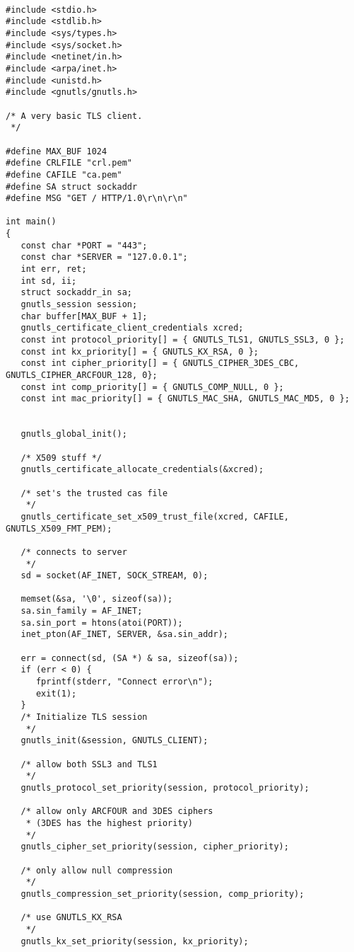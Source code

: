 \begin{verbatim}

#include <stdio.h>
#include <stdlib.h>
#include <sys/types.h>
#include <sys/socket.h>
#include <netinet/in.h>
#include <arpa/inet.h>
#include <unistd.h>
#include <gnutls/gnutls.h>

/* A very basic TLS client.
 */

#define MAX_BUF 1024
#define CRLFILE "crl.pem"
#define CAFILE "ca.pem"
#define SA struct sockaddr
#define MSG "GET / HTTP/1.0\r\n\r\n"

int main()
{
   const char *PORT = "443";
   const char *SERVER = "127.0.0.1";
   int err, ret;
   int sd, ii;
   struct sockaddr_in sa;
   gnutls_session session;
   char buffer[MAX_BUF + 1];
   gnutls_certificate_client_credentials xcred;
   const int protocol_priority[] = { GNUTLS_TLS1, GNUTLS_SSL3, 0 };
   const int kx_priority[] = { GNUTLS_KX_RSA, 0 };
   const int cipher_priority[] = { GNUTLS_CIPHER_3DES_CBC, GNUTLS_CIPHER_ARCFOUR_128, 0};
   const int comp_priority[] = { GNUTLS_COMP_NULL, 0 };
   const int mac_priority[] = { GNUTLS_MAC_SHA, GNUTLS_MAC_MD5, 0 };


   gnutls_global_init();

   /* X509 stuff */
   gnutls_certificate_allocate_credentials(&xcred);

   /* set's the trusted cas file
    */
   gnutls_certificate_set_x509_trust_file(xcred, CAFILE, GNUTLS_X509_FMT_PEM);

   /* connects to server 
    */
   sd = socket(AF_INET, SOCK_STREAM, 0);

   memset(&sa, '\0', sizeof(sa));
   sa.sin_family = AF_INET;
   sa.sin_port = htons(atoi(PORT));
   inet_pton(AF_INET, SERVER, &sa.sin_addr);

   err = connect(sd, (SA *) & sa, sizeof(sa));
   if (err < 0) {
      fprintf(stderr, "Connect error\n");
      exit(1);
   }
   /* Initialize TLS session 
    */
   gnutls_init(&session, GNUTLS_CLIENT);

   /* allow both SSL3 and TLS1
    */
   gnutls_protocol_set_priority(session, protocol_priority);

   /* allow only ARCFOUR and 3DES ciphers
    * (3DES has the highest priority)
    */
   gnutls_cipher_set_priority(session, cipher_priority);

   /* only allow null compression
    */
   gnutls_compression_set_priority(session, comp_priority);

   /* use GNUTLS_KX_RSA
    */
   gnutls_kx_set_priority(session, kx_priority);


\end{verbatim}
